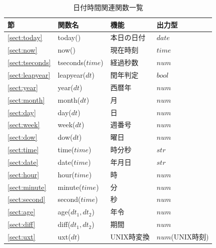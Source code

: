 \begin{table}[!hb]
\begin{center}
\caption{日付時間関連関数一覧\label{tbl:mcal_date}}
{\small
  \begin{tabular}{l|l|l|l} \hline
節&関数名&機能&出力型\\ \hline

\ref{sect:today}& today()&
本日の日付&$date$\\

\ref{sect:now}& now()&
現在時刻&$time$\\

\ref{sect:tseconds}& tseconds($time$)&
経過秒数&$num$\\

\ref{sect:leapyear}& leapyear($dt$)&
閏年判定&$bool$\\

\ref{sect:year}& year($dt$)&
西暦年&$num$\\

\ref{sect:month}& month($dt$)&
月&$num$\\

\ref{sect:day}& day($dt$)&
日&$num$\\

\ref{sect:week}& week($dt$)&
週番号&$num$\\

\ref{sect:dow}& dow($dt$)&
曜日&$num$\\

\ref{sect:time}& time($time$)&
時分秒&$str$\\

\ref{sect:date}& date($time$)&
年月日&$str$\\

\ref{sect:hour}& hour($time$)&
時&$num$\\

\ref{sect:minute}& minute($time$)&
分&$num$\\

\ref{sect:second}& second($time$)&
秒&$num$\\

\ref{sect:age}& age($dt_1,dt_2$)&
年令&$num$\\

\ref{sect:diff}& diff($dt_1,dt_2$)&
期間&$num$\\

\ref{sect:uxt}& uxt($dt$)&
UNIX時変換&$num$(UNIX時刻)\\



\end{tabular}}
\end{center}
\end{table}
